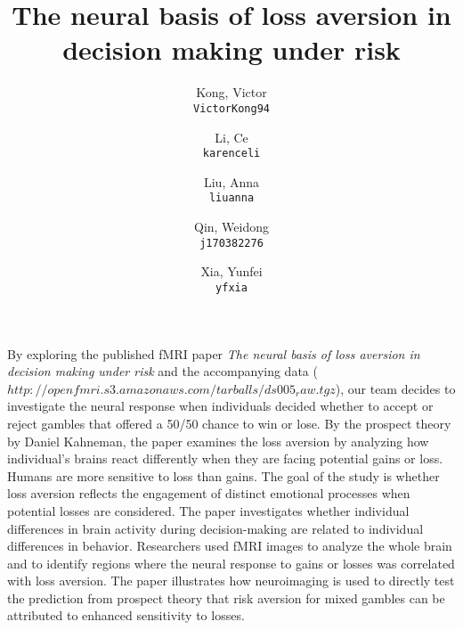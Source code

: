 \documentclass[11pt]{article}
\title{The neural basis of loss aversion in decision making under risk}
\author{
  Kong, Victor\\
  \texttt{VictorKong94}
  \and
  Li, Ce\\
  \texttt{karenceli}
  \and
  Liu, Anna\\
  \texttt{liuanna}
  \and
  Qin, Weidong\\
  \texttt{j170382276}
  \and
  Xia, Yunfei\\
  \texttt{yfxia}
}
\begin{document}
\maketitle

By exploring the published fMRI paper \textit{The neural basis of loss aversion in decision making under risk} and the accompanying data ($http://openfmri.s3.amazonaws.com/tarballs/ds005_raw.tgz$), our team decides to investigate the neural response when individuals decided whether to accept or reject gambles that offered a 50/50 chance to win or lose. By the prospect theory by Daniel Kahneman, the paper examines the loss aversion by analyzing how individual's brains react differently when they are facing potential gains or loss. Humans are more sensitive to loss than gains. The goal of the study is whether loss aversion reflects the engagement of distinct emotional processes when potential losses are considered. The paper investigates whether individual differences in brain activity during decision-making are related to individual differences in behavior. Researchers used fMRI images to analyze the whole brain and to identify regions where the neural response to gains or losses was correlated with loss aversion. The paper illustrates how neuroimaging is used to directly test the prediction from prospect theory that risk aversion for mixed gambles can be attributed to enhanced sensitivity to losses. 


\end{document}
